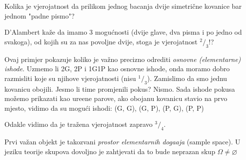 \begin{pr}[D'Alambert 1754]
    Kolika je vjerojatnost da prilikom jednog bacanja dvije
    simetri\v cne kovanice bar jednom "padne pismo"?
\end{pr}

\begin{rj}
    D'Alambert ka\v ze da imamo 3 mogu\' cnosti (dvije glave,
    dva pisma i po jedno od svakoga), od kojih su za nas povoljne
    dvije, stoga je vjerojatnost $^2 / _3$!?
    
    Ovaj primjer pokazuje koliko je va\v zno precizno odrediti
    \emph{osnovne (elementarne) ishode}. Uzmemo li 2G, 2P i 1G1P kao
    osnovne ishode, onda moramo dobro razmisliti koje su njihove
    vjerojatnosti (nisu $^1 / _3$). Zamislimo da smo jednu
    kovanicu obojili. Jesmo li time promjenili pokus? Nismo.
    Sada ishode pokusa mo\v zemo prikazati kao ure\dj ene parove,
    ako obojanu kovanicu stavio na prvo mjesto, vidimo da su
    mogu\' ci ishodi:
    (G, G), (G, P), (P, G), (P, P)
    
    Odakle vidimo da je tra\v zena vjerojatnost zapravo $^3 / _4$.
\end{rj}

Prvi va\v zan objekt je takozvani \emph{prostor elementarnih
doga\dj aja} (sample space). U jeziku teorije skupova dovoljno je
zahtjevati da to bude neprazan skup $\Omega \neq \varnothing$
